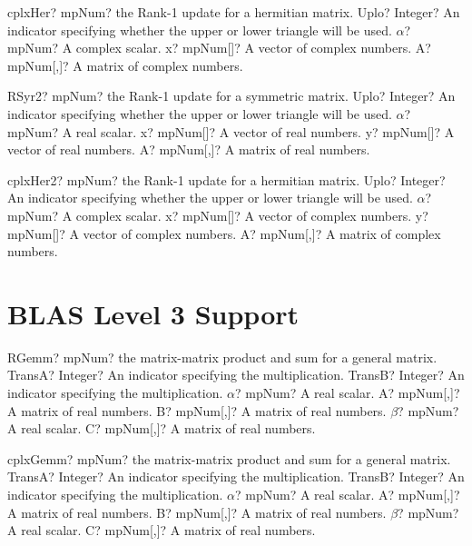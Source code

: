 \documentclass[12pt,a4paper,openany]{book}
\begin{document}
\begin{mpFunctionsExtract}
\mpFunctionFour
{cplxHer? mpNum? the Rank-1 update for a hermitian matrix.}
{Uplo? Integer? An indicator specifying whether the upper or lower triangle will be used.}
{$\alpha$? mpNum? A complex scalar.}
{x? mpNum[]? A vector of complex numbers.}
{A? mpNum[,]? A matrix of complex numbers.}
\end{mpFunctionsExtract}

\begin{mpFunctionsExtract}
\mpFunctionFive
{RSyr2? mpNum? the Rank-1 update for a symmetric matrix.}
{Uplo? Integer? An indicator specifying whether the upper or lower triangle will be used.}
{$\alpha$? mpNum? A real scalar.}
{x? mpNum[]? A vector of real numbers.}
{y? mpNum[]? A vector of real numbers.}
{A? mpNum[,]? A matrix of real numbers.}
\end{mpFunctionsExtract}

\begin{mpFunctionsExtract}
\mpFunctionFive
{cplxHer2? mpNum? the Rank-1 update for a hermitian matrix.}
{Uplo? Integer? An indicator specifying whether the upper or lower triangle will be used.}
{$\alpha$? mpNum? A complex scalar.}
{x? mpNum[]? A vector of complex numbers.}
{y? mpNum[]? A vector of complex numbers.}
{A? mpNum[,]? A matrix of complex numbers.}
\end{mpFunctionsExtract}

\section{BLAS Level 3 Support}

\begin{mpFunctionsExtract}
\mpFunctionSeven
{RGemm? mpNum? the matrix-matrix product and sum for a general matrix.}
{TransA? Integer? An indicator specifying the multiplication.}
{TransB? Integer? An indicator specifying the multiplication.}
{$\alpha$? mpNum? A real scalar.}
{A? mpNum[,]? A matrix of real numbers.}
{B? mpNum[,]? A matrix of real numbers.}
{$\beta$? mpNum? A real scalar.}
{C? mpNum[,]? A matrix of real numbers.}
\end{mpFunctionsExtract}

\begin{mpFunctionsExtract}
\mpFunctionSeven
{cplxGemm? mpNum? the matrix-matrix product and sum for a general matrix.}
{TransA? Integer? An indicator specifying the multiplication.}
{TransB? Integer? An indicator specifying the multiplication.}
{$\alpha$? mpNum? A real scalar.}
{A? mpNum[,]? A matrix of real numbers.}
{B? mpNum[,]? A matrix of real numbers.}
{$\beta$? mpNum? A real scalar.}
{C? mpNum[,]? A matrix of real numbers.}
\end{mpFunctionsExtract}
\end{document}

